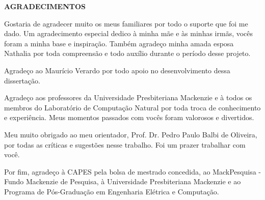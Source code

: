 \newpage
\pagestyle{empty}
\large
\textbf{AGRADECIMENTOS}

Gostaria de agradecer muito os meus familiares por todo o suporte que foi me dado. Um agradecimento especial dedico à minha mãe e às minhas irmãs, vocês foram a minha base e inspiração. Também agradeço minha amada esposa Nathalia por toda compreensão e todo auxílio durante o período desse projeto.

Agradeço ao Maurício Verardo por todo apoio no desenvolvimento dessa dissertação.

Agradeço aos professores da Universidade Presbiteriana Mackenzie e à todos os membros do Laboratório de Computação Natural por toda troca de conhecimento e experiência. Meus momentos passados com vocês foram valorosos e divertidos.

Meu muito obrigado ao meu orientador, Prof. Dr. Pedro Paulo Balbi de Oliveira, por todas as críticas e sugestões nesse trabalho. Foi um prazer trabalhar com você.

Por fim, agradeço à CAPES pela bolsa de mestrado concedida, ao MackPesquisa - Fundo Mackenzie de Pesquisa, à Universidade Presbiteriana Mackenzie e ao Programa de Pós-Graduação em Engenharia Elétrica e Computação.